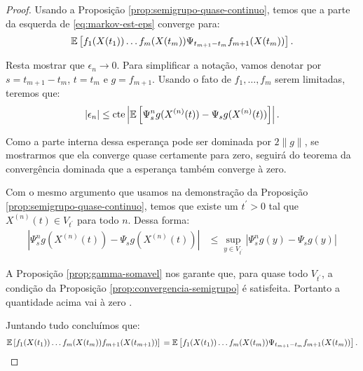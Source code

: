 \begin{proof}
  Usando a Proposição \ref{prop:semigrupo-quase-continuo}, temos que a
  parte da esquerda de \eqref{eq:markov-est-eps} converge para:
  \begin{displaymath}
    {\mathbb{E}} \left[
      f_{1}(X(t_{1})) 
      \ldots
      f_{m}(X(t_{m})) 
      \Psi_{t_{m+1} - t_{m}} f_{m+1} (X(t_{m})) 
    \right].
  \end{displaymath}

  Resta mostrar que $\epsilon_n \to 0$. Para simplificar a notação,
  vamos denotar por $s = t_{m+1} - t_m$, $t = t_m$ e $g = f_{m+1}$.
  Usando o fato de $f_1, \ldots, f_m$ serem limitadas, teremos que:
  \begin{displaymath}
    |\epsilon_n| \leq  \textrm{cte}
    \left\lvert {\mathbb{E}} \left[
        \Psi_{s}^n g (X^{(n)}(t)) -
        \Psi_{s} g (X^{(n)}(t))
      \right]
    \right\rvert.
  \end{displaymath}

  Como a parte interna dessa esperança pode ser dominada por $2\lVert
  g \rVert$, se mostrarmos que ela converge quase certamente para
  zero, seguirá do teorema da convergência dominada que a esperança também
  converge à zero.

  Com o mesmo argumento que usamos na demonstração da Proposição
  \ref{prop:semigrupo-quase-continuo}, temos que existe um $t^{\prime}
  > 0$ tal que $X^{(n)}(t) \in V_{t^\prime}$ para todo $n$. Dessa forma:
  \begin{align*}
    \left\lvert \Psi_{s}^n g (X^{(n)}(t)) - \Psi_{s} g (X^{(n)}(t))
    \right\rvert
    &\leq \sup_{y \in V_{t^\prime}}  \left\lvert \Psi_{s}^n g (y) - \Psi_{s} g (y)
    \right\rvert
  \end{align*}

  A Proposição \ref{prop:gamma-somavel} nos garante que, para quase
  todo $V_{t^\prime}$, a condição da Proposição
  \ref{prop:convergencia-semigrupo} é satisfeita. Portanto a
  quantidade acima vai à zero \qc.

  Juntando tudo concluímos que:
  \begin{displaymath}
    {\mathbb{E}} \left[
      f_{1}(X(t_{1})) 
      \ldots
      f_{m}(X(t_{m})) 
      f_{m+1}(X(t_{m+1})) 
    \right] \notag\\
    = {\mathbb{E}} \left[
      f_{1}(X(t_{1})) 
      \ldots
      f_{m}(X(t_{m})) 
      \Psi_{t_{m+1} - t_{m}} f_{m+1} (X(t_{m})) 
    \right].
  \end{displaymath}
\end{proof}


